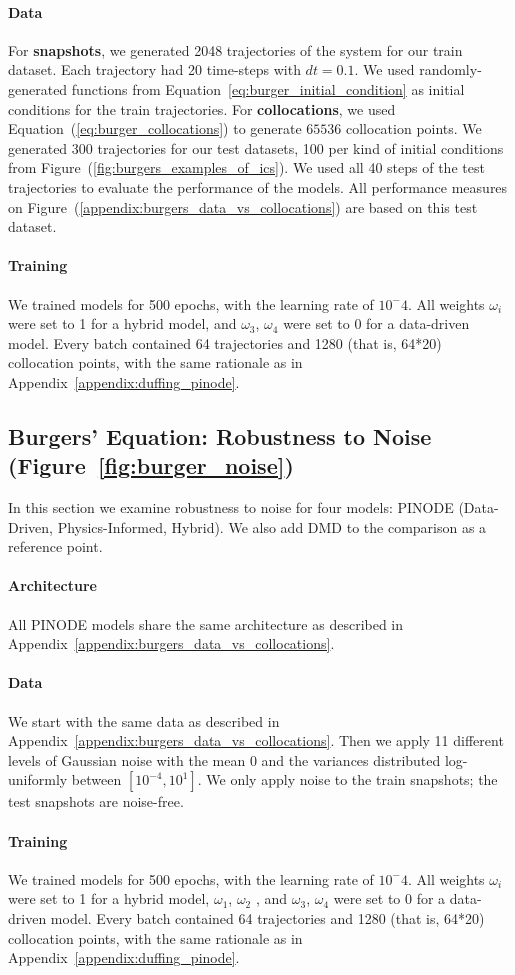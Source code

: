 \paragraph{Data} For \textbf{snapshots}, we generated 2048 trajectories of the system for our train dataset. Each trajectory had 20 time-steps with $dt = 0.1$. We used randomly-generated functions from Equation~\ref{eq:burger_initial_condition} as initial conditions for the train trajectories. 
For \textbf{collocations}, we used Equation~(\ref{eq:burger_collocations}) to generate $65536$ collocation points. 
We generated 300 trajectories for our test datasets, 100 per kind of initial conditions from Figure~(\ref{fig:burgers_examples_of_ics}). We used all 40 steps of the test trajectories to evaluate the performance of the models. All performance measures on Figure~(\ref{appendix:burgers_data_vs_collocations}) are based on this test dataset.


\paragraph{Training} We trained models for 500 epochs, with the learning rate of $10^-4$. All weights $\omega_i$ were set to 1 for a hybrid model, and $\omega_3$, $\omega_4$ were set to 0 for a data-driven model. Every batch contained 64 trajectories and 1280 (that is, 64*20) collocation points, with the same rationale as in Appendix~\ref{appendix:duffing_pinode}.

\subsection{Burgers' Equation: Robustness to Noise (Figure~\ref{fig:burger_noise})}
In this section we examine robustness to noise for four models: PINODE (Data-Driven, Physics-Informed, Hybrid). We also add DMD to the comparison as a reference point.
\label{appendix:burgers_noise}
\paragraph{Architecture} All PINODE models share the same architecture as described in Appendix~\ref{appendix:burgers_data_vs_collocations}.

\paragraph{Data} We start with the same data as described in Appendix~\ref{appendix:burgers_data_vs_collocations}. Then we apply 11 different levels of Gaussian noise with the mean 0 and the variances distributed log-uniformly between $[10^{-4}, 10^1]$. We only apply noise to the train snapshots; the test snapshots are noise-free. 

\paragraph{Training} We trained models for 500 epochs, with the learning rate of $10^-4$. All weights $\omega_i$ were set to 1 for a hybrid model, $\omega_1$, $\omega_2$ , and $\omega_3$, $\omega_4$ were set to 0 for a data-driven model. Every batch contained 64 trajectories and 1280 (that is, 64*20) collocation points, with the same rationale as in Appendix~\ref{appendix:duffing_pinode}.